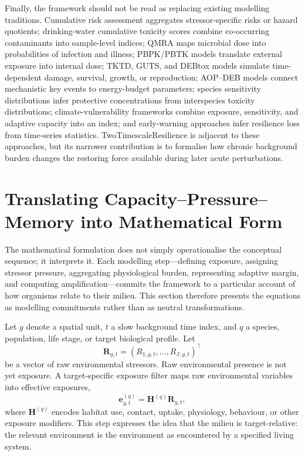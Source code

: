 Finally, the framework should not be read as replacing existing modelling traditions. Cumulative risk assessment aggregates stressor-specific risks or hazard quotients; drinking-water cumulative toxicity scores combine co-occurring contaminants into sample-level indices; QMRA maps microbial dose into probabilities of infection and illness; PBPK/PBTK models translate external exposure into internal dose; TKTD, GUTS, and DEBtox models simulate time-dependent damage, survival, growth, or reproduction; AOP--DEB models connect mechanistic key events to energy-budget parameters; species sensitivity distributions infer protective concentrations from interspecies toxicity distributions; climate-vulnerability frameworks combine exposure, sensitivity, and adaptive capacity into an index; and early-warning approaches infer resilience loss from time-series statistics. TwoTimescaleResilience is adjacent to these approaches, but its narrower contribution is to formalise how chronic background burden changes the restoring force available during later acute perturbations.

\section{Translating Capacity--Pressure--Memory into Mathematical Form}
\label{sec:formal_translation}

The mathematical formulation does not simply operationalise the conceptual sequence; it interprets it. Each modelling step---defining exposure, assigning stressor pressure, aggregating physiological burden, representing adaptive margin, and computing amplification---commits the framework to a particular account of how organisms relate to their milieu. This section therefore presents the equations as modelling commitments rather than as neutral transformations.

Let $g$ denote a spatial unit, $t$ a slow background time index, and $q$ a species, population, life stage, or target biological profile. Let
\begin{equation}
  \mathbf{R}_{g,t} = (R_{1,g,t},\ldots,R_{J,g,t})^\top
\end{equation}
be a vector of raw environmental stressors. Raw environmental presence is not yet exposure. A target-specific exposure filter maps raw environmental variables into effective exposures,
\begin{equation}
  \mathbf{e}^{(q)}_{g,t} = \mathbf{H}^{(q)}\mathbf{R}_{g,t},
  \label{eq:exposure_filter}
\end{equation}
where $\mathbf{H}^{(q)}$ encodes habitat use, contact, uptake, physiology, behaviour, or other exposure modifiers. This step expresses the idea that the milieu is target-relative: the relevant environment is the environment as encountered by a specified living system.


